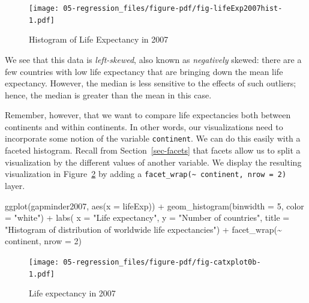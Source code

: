 \documentclass[
  letterpaper,
  DIV=11,
  numbers=noendperiod]{scrreprt}
\newenvironment{Shaded}{\begin{snugshade}}{\end{snugshade}}
\newcommand{\AttributeTok}[1]{\textcolor[rgb]{0.40,0.45,0.13}{#1}}
\newcommand{\DecValTok}[1]{\textcolor[rgb]{0.68,0.00,0.00}{#1}}
\newcommand{\FunctionTok}[1]{\textcolor[rgb]{0.28,0.35,0.67}{#1}}
\newcommand{\NormalTok}[1]{\textcolor[rgb]{0.00,0.23,0.31}{#1}}
\newcommand{\SpecialCharTok}[1]{\textcolor[rgb]{0.37,0.37,0.37}{#1}}
\newcommand{\StringTok}[1]{\textcolor[rgb]{0.13,0.47,0.30}{#1}}
\theoremstyle{definition}
\theoremstyle{remark}
\begin{document}
\begin{figure}[H]

{\centering \texttt{[image: 05-regression\_files/figure-pdf/fig-lifeExp2007hist-1.pdf]}

}

\caption{\label{fig-lifeExp2007hist}Histogram of Life Expectancy in
2007}

\end{figure}

We see that this data is \emph{left-skewed}, also known as
\emph{negatively} skewed: there are a few countries with low life
expectancy that are bringing down the mean life expectancy. However, the
median is less sensitive to the effects of such outliers; hence, the
median is greater than the mean in this case.

Remember, however, that we want to compare life expectancies both
between continents and within continents. In other words, our
visualizations need to incorporate some notion of the variable
\texttt{continent}. We can do this easily with a faceted histogram.
Recall from Section~\ref{sec-facets} that facets allow us to split a
visualization by the different values of another variable. We display
the resulting visualization in Figure~\ref{fig-catxplot0b} by adding a
\texttt{facet\_wrap(\textasciitilde{}\ continent,\ nrow\ =\ 2)} layer.

\begin{Shaded}
\begin{Highlighting}[]
\FunctionTok{ggplot}\NormalTok{(gapminder2007, }\FunctionTok{aes}\NormalTok{(}\AttributeTok{x =}\NormalTok{ lifeExp)) }\SpecialCharTok{+}
  \FunctionTok{geom\_histogram}\NormalTok{(}\AttributeTok{binwidth =} \DecValTok{5}\NormalTok{, }\AttributeTok{color =} \StringTok{"white"}\NormalTok{) }\SpecialCharTok{+}
  \FunctionTok{labs}\NormalTok{(}
    \AttributeTok{x =} \StringTok{"Life expectancy"}\NormalTok{,}
    \AttributeTok{y =} \StringTok{"Number of countries"}\NormalTok{,}
    \AttributeTok{title =} \StringTok{"Histogram of distribution of worldwide life expectancies"}\NormalTok{) }\SpecialCharTok{+}
  \FunctionTok{facet\_wrap}\NormalTok{(}\SpecialCharTok{\textasciitilde{}}\NormalTok{ continent, }\AttributeTok{nrow =} \DecValTok{2}\NormalTok{)}
\end{Highlighting}
\end{Shaded}

\begin{figure}

{\centering \texttt{[image: 05-regression\_files/figure-pdf/fig-catxplot0b-1.pdf]}

}

\caption{\label{fig-catxplot0b}Life expectancy in 2007}

\end{figure}
\end{document}
